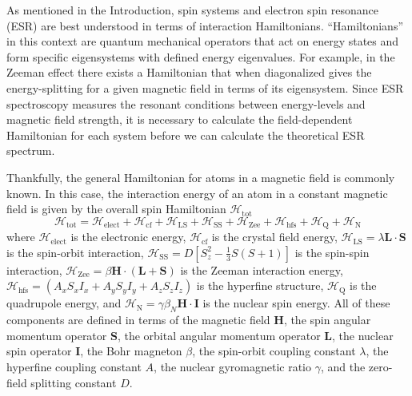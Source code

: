 \documentclass[oneside]{BYUPhys}
\begin{document}
As mentioned in the Introduction, spin systems and electron spin resonance (ESR) are best understood in terms of interaction Hamiltonians. ``Hamiltonians'' in this context are quantum mechanical operators that act on energy states and form specific eigensystems with defined energy eigenvalues. For example, in the Zeeman effect there exists a Hamiltonian that when diagonalized gives the energy-splitting for a given magnetic field in terms of its eigensystem. Since ESR spectroscopy measures the resonant conditions between energy-levels and magnetic field strength, it is necessary to calculate the field-dependent Hamiltonian for each system before we can calculate the theoretical ESR spectrum.

Thankfully, the general Hamiltonian for atoms in a magnetic field is commonly known. In this case, the interaction energy of an atom in a constant magnetic field is given by the overall spin Hamiltonian $\mathcal{H}_{\text{tot}}$ $$\mathcal{H}_{\text{tot}} = \mathcal{H}_{\text{elect}} + \mathcal{H}_{\text{cf}} + \mathcal{H}_{\text{LS}} + \mathcal{H}_{\text{SS}} + \mathcal{H}_{\text{Zee}} + \mathcal{H}_{\text{hfs}} + \mathcal{H}_{\text{Q}} + \mathcal{H}_{\text{N}}$$ where $\mathcal{H}_{\text{elect}}$ is the electronic energy, $\mathcal{H}_{\text{cf}}$ is the crystal field energy, $\mathcal{H}_{\text{LS}} = \lambda \mathbf{L} \cdot \mathbf{S}$ is the spin-orbit interaction, $\mathcal{H}_{\text{SS}} = D \left[ S_{z}^{2} - \frac{1}{3} S (S+1) \right]$ is the spin-spin interaction, $\mathcal{H}_{\text{Zee}} = \beta \mathbf{H} \cdot (\mathbf{L}+\mathbf{S})$ is the Zeeman interaction energy, $\mathcal{H}_{\text{hfs}} = \left(A_xS_xI_x + A_yS_yI_y + A_zS_zI_z\right)$ is the hyperfine structure, $\mathcal{H}_{\text{Q}}$ is the quadrupole energy, and $\mathcal{H}_{\text{N}} = \gamma \beta_{N} \mathbf{H} \cdot \mathbf{I}$ is the nuclear spin energy. All of these components are defined in terms of the magnetic field $\mathbf{H}$, the spin angular momentum operator $\mathbf{S}$, the orbital angular momentum operator $\mathbf{L}$, the nuclear spin operator $\mathbf{I}$, the Bohr magneton $\beta$, the spin-orbit coupling constant $\lambda$, the hyperfine coupling constant $A$, the nuclear gyromagnetic ratio $\gamma$, and the zero-field splitting constant $D$.
\end{document}
